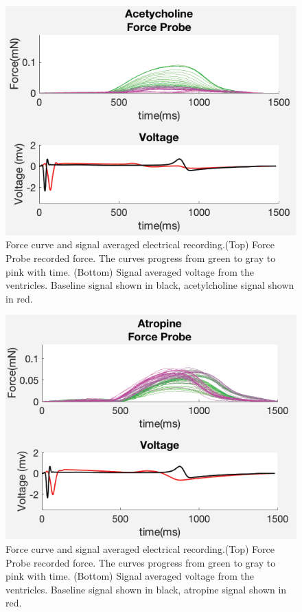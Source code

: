 \documentclass[12pt]{article}
\begin{document}
\begin{figure}[H]
	\label{fig:Ach}
	\centering
	\includegraphics[width = .95\textwidth]{Figures/Ach.png}
	\caption{Force curve and signal averaged electrical recording.(Top) Force Probe recorded force. The curves progress from green to gray to pink with time. (Bottom) Signal averaged voltage from the ventricles. Baseline signal shown in black, acetylcholine signal shown in red. }
\end{figure}
\begin{figure}[H]
	\label{fig:Atropine}
	\centering
	\includegraphics[width = .95\textwidth]{Figures/Atropine.png}
	\caption{Force curve and signal averaged electrical recording.(Top) Force Probe recorded force. The curves progress from green to gray to pink with time. (Bottom) Signal averaged voltage from the ventricles. Baseline signal shown in black, atropine signal shown in red. }
\end{figure}
\end{document}
